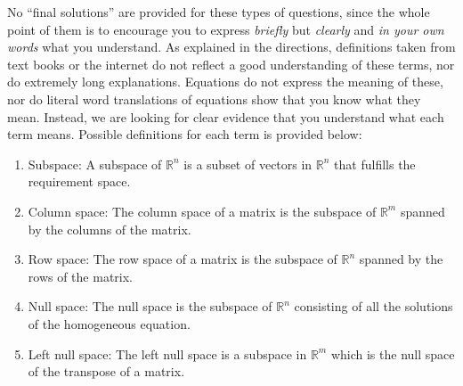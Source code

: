 No ``final solutions'' are provided for these types of questions, since the
whole point of them is to encourage you to express \emph{briefly} but
\emph{clearly} and \emph{in your own words} what you understand. As
explained in the directions, definitions taken from text books or the
internet do not reflect a good understanding of these terms, nor do
extremely long explanations. Equations do not express the meaning of these,
nor do literal word translations of equations show that you know what they
mean. Instead, we are looking for clear evidence that you understand what
each term means. Possible definitions for each term is provided below: 
\begin{mdframed}[style=MyFrame]
    \begin{enumerate}[label=(\alph*)]
        \item Subspace: A subspace of $\mathbb{R}^{n}$ is a subset of
            vectors in $\mathbb{R}^{n}$ that fulfills the requirement
            space.
            
        \item Column space: The column space of a matrix is the subspace of
            $\mathbb{R}^{m}$ spanned by the columns of the matrix.

        \item Row space: The row space of a matrix is the subspace of
            $\mathbb{R}^{n}$ spanned by the rows of the matrix.
            
        \item Null space: The null space is the subspace of
            $\mathbb{R}^{n}$ consisting of all the solutions of the
            homogeneous equation.

        \item Left null space: The left null space is a subspace in
            $\mathbb{R}^{m}$ which is the null space of the transpose of a
            matrix.
    \end{enumerate}
\end{mdframed}
